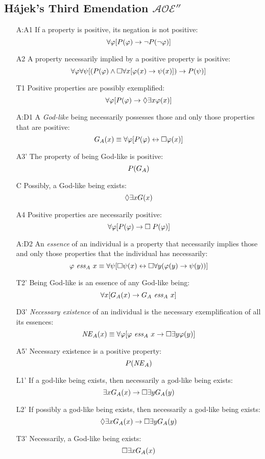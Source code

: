 \documentclass{birkjour}
\newcommand{\AOEHHH}{$\mathcal{AOE}''$}
\theoremstyle{definition}
\theoremstyle{remark}
\numberwithin{equation}{section}
\begin{document}
\begin{appendix}
\section{Hájek's Third Emendation \AOEHHH} \label{apx:Hajek3}

\begin{itemize}
\item[A:A1] If a property is positive, its negation is not positive:
  $$\forall \varphi [P(\varphi) \rightarrow \neg P(\neg \varphi)]$$ 
\item[A2] A property necessarily implied by a
  positive property is positive:
  $$\forall \varphi \forall \psi [(P(\varphi) \wedge \Box \forall x [\varphi(x)
  \rightarrow \psi(x)]) \rightarrow P(\psi)]$$
\item[T1] Positive properties are possibly exemplified: 
  $$\forall \varphi [P(\varphi) \rightarrow \Diamond \exists x \varphi(x)]$$ 
\item[A:D1] A \emph{God-like} being necessarily possesses those and only those properties that are positive: 
  $$G_A(x) \equiv \forall \varphi [P(\varphi) \leftrightarrow \Box \varphi(x)]$$ 
\item[A3']  The property of being God-like is positive: 
  $$P(G_A)$$
\item[C\phantom{1}] Possibly, a God-like being exists: $$\Diamond \exists x G(x)$$
\item[A4]  Positive properties are necessarily positive: 
  $$\forall \varphi [P(\varphi) \rightarrow \Box \; P(\varphi)]$$ 
\item[A:D2] An \emph{essence} of an individual is a property that necessarily implies those and only those properties that the individual has necessarily: $$\varphi \ \mathit{ess}_A \ x \equiv \forall
  \psi [\Box \psi(x) \leftrightarrow \Box \forall y (\varphi(y) \rightarrow \psi(y))]$$ 
\item[T2']  Being God-like is an essence of any
  God-like being: $$\forall x [G_A(x) \rightarrow G_A \ \mathit{ess}_A \ x]$$
\item[D3'] \emph{Necessary existence} of an individual is the necessary exemplification of all its essences: 
  $$\mathit{NE}_A(x) \equiv \forall \varphi [\varphi \ \mathit{ess}_A \ x \rightarrow \Box
  \exists y \varphi(y)]$$
\item[A5'] Necessary existence is a positive property: $$P(\mathit{NE}_A)$$ 
\item[L1'] If a god-like being exists, then necessarily a god-like being exists: 
  $$\exists x G_A(x) \rightarrow \Box \exists y G_A(y)$$
\item[L2'] If possibly a god-like being exists, then necessarily a god-like being exists: 
  $$\Diamond \exists x G_A(x) \rightarrow \Box \exists y G_A(y) $$
%
\item[T3'] Necessarily, a God-like being exists: $$\Box \exists x G_A(x)$$ 
\end{itemize}




\end{appendix}
\end{document}
